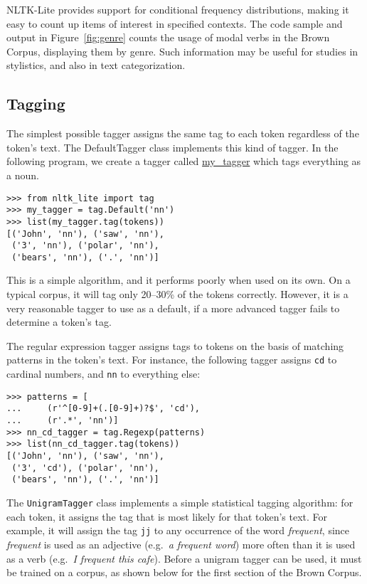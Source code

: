 \documentclass[11pt]{article}
\begin{document}
NLTK-Lite provides support for conditional frequency distributions, making it easy
to count up items of interest in specified contexts.  The code sample and output in
Figure~\ref{fig:genre} counts the usage of modal verbs in the Brown Corpus, displaying
them by genre.  Such information may be useful for studies in stylistics, and also in
text categorization.

\subsection{Tagging}

The simplest possible tagger assigns the same tag to each token
regardless of the token's text. The DefaultTagger class implements
this kind of tagger. In the following program, we create a tagger
called \url{my_tagger} which tags everything as a noun.

{\small\begin{verbatim}
>>> from nltk_lite import tag
>>> my_tagger = tag.Default('nn')
>>> list(my_tagger.tag(tokens))
[('John', 'nn'), ('saw', 'nn'),
 ('3', 'nn'), ('polar', 'nn'),
 ('bears', 'nn'), ('.', 'nn')]
\end{verbatim}}

This is a simple algorithm, and it performs poorly when used on its own.
On a typical corpus, it will tag only 20--30\% of the tokens correctly.
However, it is a very reasonable tagger to use as a default, if a more
advanced tagger fails to determine a token's tag.

The regular expression tagger assigns tags to tokens on the basis of
matching patterns in the token's text. For instance, the following
tagger assigns \texttt{cd} to cardinal numbers, and \texttt{nn} to
everything else:

{\small\begin{verbatim}
>>> patterns = [
...     (r'^[0-9]+(.[0-9]+)?$', 'cd'),
...     (r'.*', 'nn')]
>>> nn_cd_tagger = tag.Regexp(patterns)
>>> list(nn_cd_tagger.tag(tokens))
[('John', 'nn'), ('saw', 'nn'),
 ('3', 'cd'), ('polar', 'nn'),
 ('bears', 'nn'), ('.', 'nn')]
\end{verbatim}}
    
The \texttt{UnigramTagger} class implements a simple statistical tagging
algorithm: for each token, it assigns the tag that is most likely
for that token's text. For example, it will assign the tag \texttt{jj} to
any occurrence of the word \textit{frequent}, since \textit{frequent} is used as an
adjective (e.g.\ \textit{a frequent word}) more often than it is used as a
verb (e.g.\ \textit{I frequent this cafe}).
Before a unigram tagger can be used, it must be trained on
a corpus, as shown below for the first section of the Brown Corpus.
\end{document}
